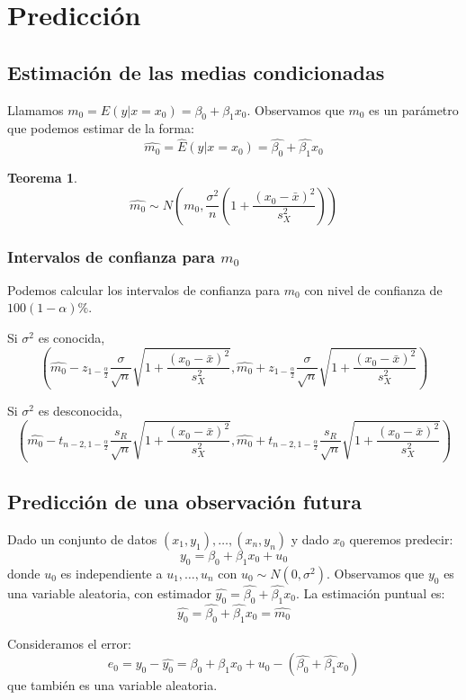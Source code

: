 \documentclass{report}
\newtheorem{theorem}{Teorema}[chapter]
\theoremstyle{remark}
\theoremstyle{remark}
\theoremstyle{remark}
\theoremstyle{definition}
\theoremstyle{definition}
\theoremstyle{definition}
\begin{document}
\section{Predicción}

\subsection*{Estimación de las medias condicionadas}
Llamamos $m_0 = E(y | x=x_0) = \beta_0 + \beta_1x_0$.
Observamos que $m_0$ es un parámetro que podemos estimar de la forma:
$$\hat{m_0} = \hat{E}(y | x=x_0) = \hat{\beta_0} + \hat{\beta_1}x_0$$

\begin{theorem}
    $$\hat{m_0} \sim N\left( m_0, \frac{\sigma^2}{n} \left(1+\frac{(x_0-\bar{x})^2}{s_X^2}\right) \right)$$
\end{theorem}

\subsubsection*{Intervalos de confianza para $m_0$}
Podemos calcular los intervalos de confianza para $m_0$ con nivel de confianza de $100(1-\alpha)\%$.

Si $\sigma^2$ es conocida,
$$\left( \hat{m_0} - z_{1-\frac{\alpha}{2}} \frac{\sigma}{\sqrt{n}} \sqrt{1 + \frac{(x_0-\bar{x})^2}{s_X^2}}, \hat{m_0} + z_{1-\frac{\alpha}{2}} \frac{\sigma}{\sqrt{n}} \sqrt{1 + \frac{(x_0-\bar{x})^2}{s_X^2}} \right)$$

Si $\sigma^2$ es desconocida,
$$\left( \hat{m_0} - t_{n-2, 1-\frac{\alpha}{2}} \frac{s_R}{\sqrt{n}} \sqrt{1 + \frac{(x_0-\bar{x})^2}{s_X^2}}, \hat{m_0} + t_{n-2, 1-\frac{\alpha}{2}} \frac{s_R}{\sqrt{n}} \sqrt{1 + \frac{(x_0-\bar{x})^2}{s_X^2}} \right)$$

\subsection*{Predicción de una observación futura}
Dado un conjunto de datos $(x_1, y_1), \dots, (x_n, y_n)$ y dado $x_0$ queremos predecir:
$$y_0 = \beta_0 + \beta_1 x_0 + u_0$$
donde $u_0$ es independiente a $u_1, \dots, u_n$ con $u_0 \sim N(0, \sigma^2)$.
Observamos que $y_0$ es una variable aleatoria, con estimador $\hat{y_0} = \hat{\beta_0} + \hat{\beta_1}x_0$.
La estimación puntual es:
$$\hat{y_0} = \hat{\beta_0} + \hat{\beta_1}x_0 = \hat{m_0}$$

Consideramos el error:
$$e_0 = y_0 - \hat{y_0} = \beta_0 + \beta_1x_0 + u_0 - (\hat{\beta_0} + \hat{\beta_1}x_0)$$
que también es una variable aleatoria.
\end{document}
